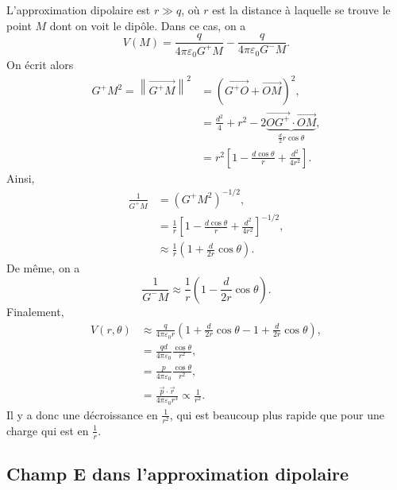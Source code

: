 L'approximation dipolaire est $r\gg q$, où $r$ est la distance à laquelle se trouve le point $M$ dont on voit le dipôle. Dans ce cas, on a 
\begin{equation*}
    V(M)=\frac{q}{4\pi\varepsilon_{0}G^{+}M}-\frac{q}{4\pi\varepsilon_{0}G^{-}M}.
\end{equation*}
On écrit alors
\begin{align*}
    G^{+}M^{2}=\left\lVert \overrightarrow{G^{+}M}\right\rVert^{2}
    &=\left(\overrightarrow{G^{+}O}+\overrightarrow{OM}\right)^{2},\\
    &=\frac{d^{2}}{4}+r^{2}-2\underbrace{\overrightarrow{OG^{+}}\cdot\overrightarrow{OM}}_{\frac{d}{2}r\cos\theta},\\
    &=r^{2}\left[
        1-\frac{d\cos\theta}{r}+\frac{d^{2}}{4r^{2}}
    \right].
\end{align*}
Ainsi,
\begin{align*}
    \frac{1}{G^{+}M}
    &=(G^{+}M^{2})^{-1/2},\\
    &=\frac{1}{r}\left[1-\frac{d\cos\theta}{r}+\frac{d^{2}}{4r^{2}}\right]^{-1/2},\\
    &\approx\frac{1}{r}\left(1+\frac{d}{2r}\cos\theta\right).
\end{align*}
De même, on a 
\begin{equation*}
    \frac{1}{G^{-}M}\approx\frac{1}{r}\left(1-\frac{d}{2r}\cos\theta\right).
\end{equation*}
Finalement,
\begin{align*}
    V(r,\theta)
    &\approx\frac{q}{4\pi\varepsilon_0 r}\left(1+\frac{d}{2r}\cos\theta-1+\frac{d}{2r}\cos\theta\right),\\
    &=\frac{qd}{4\pi\varepsilon_0}\frac{\cos\theta}{r^{2}},\\
    &=\frac{p}{4\pi\varepsilon_0}\frac{\cos\theta}{r^{2}},\\
    &=\frac{\vec{p}\cdot\vec{r}}{4\pi\varepsilon_0 r^{3}}\propto\frac{1}{r^{2}}.
\end{align*}
Il  y a donc une décroissance en $\frac{1}{r^{2}}$, qui est beaucoup plus rapide que pour une charge qui est en $\frac{1}{r}$.

\subsection{Champ E dans l'approximation dipolaire}

